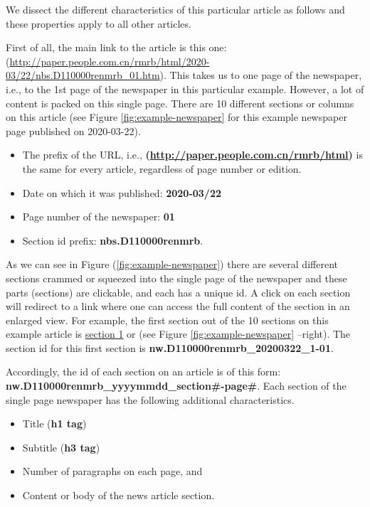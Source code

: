 \documentclass[
  12pt,
]{article}
\providecommand{\tightlist}{%
  \setlength{\itemsep}{0pt}\setlength{\parskip}{0pt}}
\begin{document}
We dissect the different characteristics of this particular article as follows and these properties apply to all other articles.

First of all, the main link to the article is this one: (\url{http://paper.people.com.cn/rmrb/html/2020-03/22/nbs.D110000renmrb_01.htm}). This takes us to one page of the newspaper, i.e., to the 1st page of the newspaper in this particular example. However, a lot of content is packed on this single page. There are 10 different sections or columns on this article (see Figure \ref{fig:example-newspaper} for this example newspaper page published on 2020-03-22).

\begin{itemize}
\item
  The prefix of the URL, i.e.,
  \textbf{(\url{http://paper.people.com.cn/rmrb/html})} is the same for every article, regardless of page number or edition.
\item
  Date on which it was published: \textbf{2020-03/22}
\item
  Page number of the newspaper: \textbf{01}
\item
  Section id prefix: \textbf{nbs.D110000renmrb}.
\end{itemize}

As we can see in Figure (\ref{fig:example-newspaper}) there are several different sections crammed or squeezed into the single page of the newspaper and these parts (sections) are clickable, and each has a unique id. A click on each section will redirect to a link where one can access the full content of the section in an enlarged view. For example, the first section out of the 10 sections on this example article is \href{http://paper.people.com.cn/rmrb/html/2020-03/22/nw.D110000renmrb_20200322_1-01.htm}{section 1} or (see Figure \ref{fig:example-newspaper} --right). The section id for this first section is \textbf{nw.D110000renmrb\_20200322\_1-01}.

Accordingly, the id of each section on an article is of this form:
\textbf{nw.D110000renmrb\_yyyymmdd\_section\#-page\#}. Each section of the single page newspaper has the following additional characteristics.

\begin{itemize}
\tightlist
\item
  Title (\textbf{h1 tag})
\item
  Subtitle (\textbf{h3 tag})
\item
  Number of paragraphs on each page, and
\item
  Content or body of the news article section.
\end{itemize}
\end{document}
